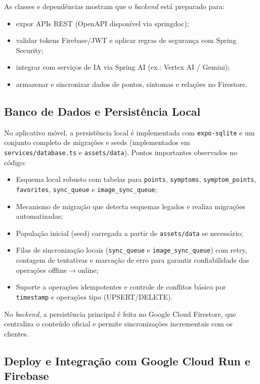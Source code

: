 As classes e dependências mostram que o \textit{backend} está preparado para:
\begin{itemize}
    \item expor APIs REST (OpenAPI disponível via springdoc);
    \item validar tokens Firebase/JWT e aplicar regras de segurança com Spring Security;
    \item integrar com serviços de IA via Spring AI (ex.: Vertex AI / Gemini);
    \item armazenar e sincronizar dados de pontos, sintomas e relações no Firestore.
\end{itemize}

\subsection{Banco de Dados e Persistência Local}

No aplicativo móvel, a persistência local é implementada com \texttt{expo-sqlite} e um conjunto completo de migrações e seeds (implementados em \texttt{services/database.ts} e \texttt{assets/data}). Pontos importantes observados no código:

\begin{itemize}
    \item Esquema local robusto com tabelas para \texttt{points}, \texttt{symptoms}, \texttt{symptom\_points}, \texttt{favorites}, \texttt{sync\_queue} e \texttt{image\_sync\_queue};
    \item Mecanismo de migração que detecta esquemas legados e realiza migrações automatizadas;
    \item População inicial (seed) carregada a partir de \texttt{assets/data} se necessário;
    \item Filas de sincronização locais (\texttt{sync\_queue} e \texttt{image\_sync\_queue}) com retry, contagem de tentativas e marcação de erro para garantir confiabilidade das operações offline$\rightarrow$online;
    \item Suporte a operações idempotentes e controle de conflitos básico por \texttt{timestamp} e operações tipo (UPSERT/DELETE).
\end{itemize}

No \textit{backend}, a persistência principal é feita no Google Cloud Firestore, que centraliza o conteúdo oficial e permite sincronizações incrementais com os clientes.

\subsection{Deploy e Integração com Google Cloud Run e Firebase} \label{sec:cloudrun_firebase}

